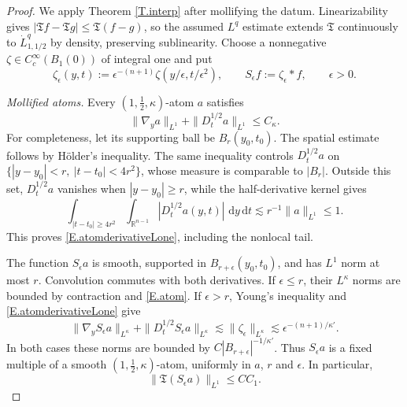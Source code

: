 \documentclass[10pt,a4paper]{amsart}
\numberwithin{equation}{section}
\newcommand{\R}{\mathbb R}
\newcommand{\dhalf}{D_t^{1/2}}
\renewcommand{\d}{\,\mathrm d}
\begin{document}
\begin{proof}
We apply Theorem \ref{T.interp} after mollifying the datum. Linearizability
gives $|\mathfrak Tf-\mathfrak Tg|\le\mathfrak T(f-g)$, so the assumed
$L^q$ estimate extends $\mathfrak T$ continuously to
$\dot L^q_{1,1/2}$ by density, preserving sublinearity.
Choose a nonnegative $\zeta\in C_c^\infty(B_1(0))$ of integral one and put
\[
 \zeta_\epsilon(y,t):=\epsilon^{-(n+1)}
       \zeta(y/\epsilon,t/\epsilon^2),\qquad
 S_\epsilon f:=\zeta_\epsilon*f,\qquad \epsilon>0.
\]
\medskip

\noindent\emph{Mollified atoms.} Every $(1,\tfrac12,\kappa)$-atom $a$ satisfies
\begin{equation}\label{E.atomderivativeLone}
 \|\nabla_y a\|_{L^1}+\|\dhalf a\|_{L^1}\le C_\kappa.
\end{equation}
For completeness, let its supporting ball be $B_r(y_0,t_0)$. The spatial
estimate follows by H\"older's inequality. The same inequality controls
$\dhalf a$ on $\{|y-y_0|<r,\ |t-t_0|<4r^2\}$, whose measure is comparable
to $|B_r|$. Outside this set, $\dhalf a$ vanishes when $|y-y_0|\ge r$,
while the half-derivative kernel gives
\[
 \int_{|t-t_0|\ge4r^2}\int_{\R^{n-1}}|\dhalf a(y,t)|\,\d y\d t
 \lesssim r^{-1}\|a\|_{L^1}\le1.
\]
This proves \eqref{E.atomderivativeLone}, including the nonlocal tail.

The function $S_\epsilon a$ is smooth, supported in $B_{r+\epsilon}(y_0,t_0)$,
and has $L^1$ norm at most $r$. Convolution commutes with both derivatives.
If $\epsilon\le r$, their $L^\kappa$ norms are bounded by contraction and
\eqref{E.atom}. If $\epsilon>r$, Young's inequality and
\eqref{E.atomderivativeLone} give
\[
 \|\nabla_y S_\epsilon a\|_{L^\kappa}
 +\|\dhalf S_\epsilon a\|_{L^\kappa}
 \lesssim\|\zeta_\epsilon\|_{L^\kappa}
 \lesssim\epsilon^{-(n+1)/\kappa'}.
\]
In both cases these norms are bounded by
$C|B_{r+\epsilon}|^{-1/\kappa'}$. Thus $S_\epsilon a$ is a fixed multiple
of a smooth $(1,\tfrac12,\kappa)$-atom, uniformly in $a$, $r$ and
$\epsilon$. In particular,
\begin{equation}\label{E.mollifiedatomendpoint}
 \|\mathfrak T(S_\epsilon a)\|_{L^1}\le C C_1.
\end{equation}
\medskip


\end{proof}
\end{document}
